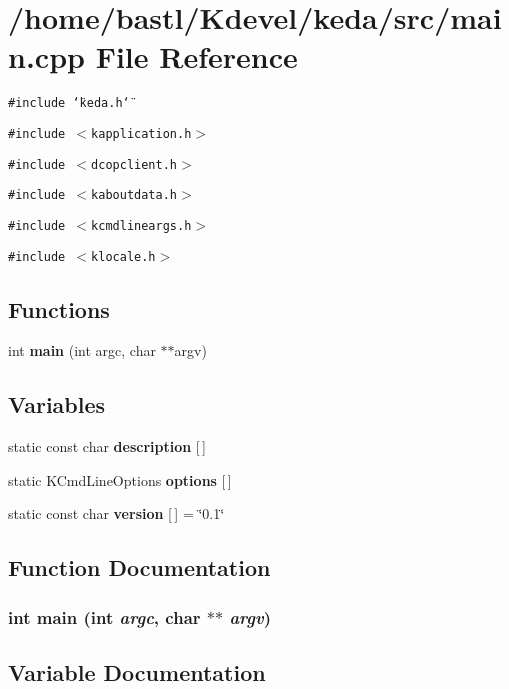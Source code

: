 \section{/home/bastl/Kdevel/keda/src/main.cpp File Reference}
\label{src_2main_8cpp}
{\tt \#include \char`\"{}keda.h\char`\"{}}\par
{\tt \#include $<$kapplication.h$>$}\par
{\tt \#include $<$dcopclient.h$>$}\par
{\tt \#include $<$kaboutdata.h$>$}\par
{\tt \#include $<$kcmdlineargs.h$>$}\par
{\tt \#include $<$klocale.h$>$}\par
\subsection*{Functions}
\begin{CompactItemize}
\item 
int {\bf main} (int argc, char $\ast$$\ast$argv)
\end{CompactItemize}
\subsection*{Variables}
\begin{CompactItemize}
\item 
static const char {\bf description} [$\,$]
\item 
static KCmd\-Line\-Options {\bf options} [$\,$]
\item 
static const char {\bf version} [$\,$] = \char`\"{}0.1\char`\"{}
\end{CompactItemize}


\subsection{Function Documentation}
\subsubsection{\setlength{\rightskip}{0pt plus 5cm}int main (int {\em argc}, char $\ast$$\ast$ {\em argv})}\label{src_2main_8cpp_30c4c19ff69d905e8e4c750b3af23485}




\subsection{Variable Documentation}
